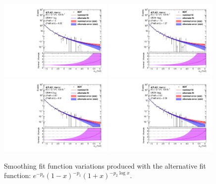 \begin{figure}[htbp!]
\begin{center}
\includegraphics[width=0.49\textwidth]{VHqqbb_AltSmoothedBDT_SRWH_1tag.pdf}
\includegraphics[width=0.49\textwidth]{VHqqbb_AltSmoothedBDT_SRZH_1tag.pdf} \\
\includegraphics[width=0.49\textwidth]{VHqqbb_AltSmoothedBDT_SRWH_2tag.pdf}
\includegraphics[width=0.49\textwidth]{VHqqbb_AltSmoothedBDT_SRZH_2tag.pdf}
\end{center}
\caption{Smoothing fit function variations produced with the alternative fit function: $e^{-p_0} \left(1 - x\right)^{-p_1} \left(1+x\right)^{-p_2 \log{x}}$.}
\label{fig:sr_smoothed_variation}
\end{figure}

